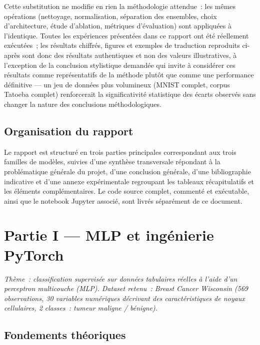 \documentclass[11pt,a4paper]{article}
\begin{document}
Cette substitution ne modifie en rien la méthodologie attendue~: les mêmes opérations (nettoyage, normalisation, séparation des ensembles, choix d'architecture, étude d'ablation, métriques d'évaluation) sont appliquées à l'identique. Toutes les expériences présentées dans ce rapport ont été réellement exécutées~; les résultats chiffrés, figures et exemples de traduction reproduits ci-après sont donc des résultats authentiques et non des valeurs illustratives, à l'exception de la conclusion stylistique demandée qui invite à considérer ces résultats comme représentatifs de la méthode plutôt que comme une performance définitive --- un jeu de données plus volumineux (MNIST complet, corpus Tatoeba complet) renforcerait la significativité statistique des écarts observés sans changer la nature des conclusions méthodologiques.

\subsection*{Organisation du rapport}

Le rapport est structuré en trois parties principales correspondant aux trois familles de modèles, suivies d'une synthèse transversale répondant à la problématique générale du projet, d'une conclusion générale, d'une bibliographie indicative et d'une annexe expérimentale regroupant les tableaux récapitulatifs et les éléments complémentaires. Le code source complet, commenté et exécutable, ainsi que le notebook Jupyter associé, sont livrés séparément de ce document.

\newpage
\section{Partie I --- MLP et ingénierie PyTorch}

\textit{Thème~: classification supervisée sur données tabulaires réelles à l'aide d'un perceptron multicouche (MLP). Dataset retenu~: Breast Cancer Wisconsin (569 observations, 30 variables numériques décrivant des caractéristiques de noyaux cellulaires, 2 classes~: tumeur maligne / bénigne).}

\subsection{Fondements théoriques}
\end{document}
